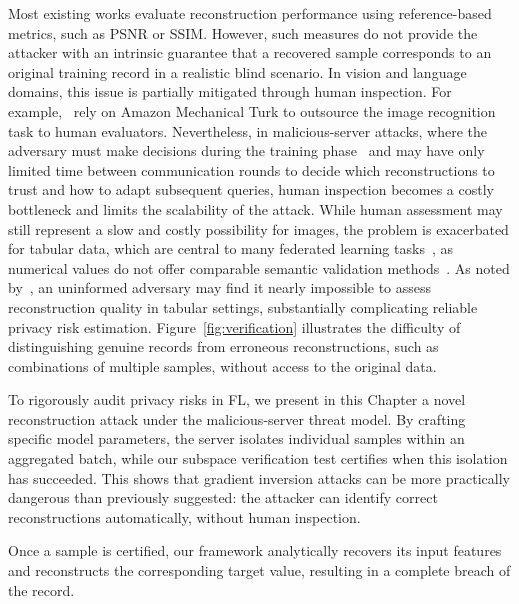 Most existing works evaluate reconstruction performance using reference-based metrics, such as PSNR or SSIM. However, such measures do not provide the attacker with an intrinsic guarantee that a recovered sample corresponds to an original training record in a realistic blind scenario. In vision and language domains, this issue is partially mitigated through human inspection. For example,~\cite{aia_fredrikson} rely on Amazon Mechanical Turk to outsource the image recognition task to human evaluators. Nevertheless, in malicious-server attacks, where the adversary must make decisions during the training phase~\cite{wenFishingUserData2022a,ctp_paper} and may have only limited time between communication rounds to decide which reconstructions to trust and how to adapt subsequent queries, human inspection becomes a costly bottleneck and limits the scalability of the attack. While human assessment may still represent a slow and costly possibility for images, the problem is exacerbated for tabular data, which are central to many federated learning tasks~\cite{ProjectAIKYA, OgierduTerrail2025FedECA}, as numerical values do not offer comparable semantic validation methods~\cite[Figure~1]{veroTabLeakTabularData2023}. As noted by~, an uninformed adversary may find it nearly impossible to assess reconstruction quality in tabular settings, substantially complicating reliable privacy risk estimation. Figure~\ref{fig:verification} illustrates the difficulty of distinguishing genuine records from erroneous reconstructions, such as combinations of multiple samples, without access to the original data.


To rigorously audit privacy risks in FL, we present in this Chapter a novel reconstruction attack under the malicious-server threat model. By crafting specific model parameters, the server isolates individual samples within an aggregated batch, while our subspace verification test certifies when this isolation has succeeded. This shows that gradient inversion attacks can be more practically dangerous than previously suggested: the attacker can identify correct reconstructions automatically, without human inspection.

Once a sample is certified, our framework analytically recovers its input features and reconstructs the corresponding target value, resulting in a complete breach of the record.

